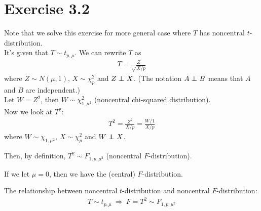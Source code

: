 \section*{Exercise 3.2}
Note that we solve this exercise for more general case where $T$ has noncentral $t$-distribution.\\

It's given that $T \sim t_{p,\mu}$. We can rewrite $T$ as
\begin{align*}
T = \frac{Z}{\sqrt{X/p}}
\end{align*}
where $Z \sim N(\mu, 1)$, $X \sim \chi_{p}^2$ and $Z \independent X$. (The notation $A \independent B$ means that $A$ and $B$ are independent.)\\
Let $W = Z^2$, then $W \sim \chi_{1, \mu^2}^2$ (noncentral chi-squared distribution).\\

Now we look at $T^2$:
\begin{align*}
T^2 = \frac{Z^2}{X/p} = \frac{W/1}{X/p}
\end{align*}
where $W \sim \chi_{1, \mu^2}$, $X \sim \chi_{p}^2$ and $W \independent X$.

Then, by definition, $T^2 \sim F_{1,p,\mu^2}$ (noncentral $F$-distribution).

If we let $\mu = 0$, then we have the (central) $F$-distribution.

\vspace{\baselineskip}
\vspace{\baselineskip}
\begin{framed}
The relationship between noncentral $t$-distribution and noncentral $F$-distribution:
\begin{align*}
T \sim t_{p, \mu} ~ \Rightarrow ~ F = T^2 \sim F_{1,p,\mu^2}
\end{align*}
\end{framed}